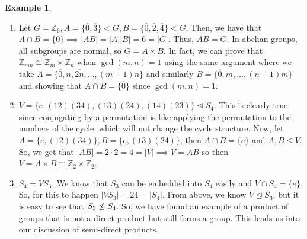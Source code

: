 \documentclass[11pt,leqno,oneside]{amsart}
\newcommand{\Z}{{\mathbb Z}} %
\newcommand{\subgroup}{\mathrel{<}}
\newcommand{\normsubgroup}{\mathrel{\unlhd}}
\newcommand{\isom}{\mathrel{\cong}}
\theoremstyle{definition}
\newtheorem{example}[thm]{Example}
\numberwithin{equation}{section}
\begin{document}
\begin{example}
    \begin{enumerate}[label=(\alph*)]
        \item Let $G = \Z_6, A = \{\overline{0}, \overline{3}\} \subgroup G, B
            = \{\overline{0}, \overline{2}, \overline{4}\} \subgroup G$. Then,
            we have that $A \cap B = \{ \overline{0} \} \implies |AB|=|A||B| =
            6 = |G|$. Thus, $AB = G$. In abelian groups, all subgroups are
            normal, so $G = A \times B$. In fact, we can prove that $\Z_{mn}
            \isom \Z_m \times \Z_n$ when $\gcd(m,n) = 1$ using the same
            argument where we take $A = \{\overline{0}, \overline{n},
            \overline{2n}, \ldots, \overline{(m-1)n}\}$ and similarly $B =
            \{\overline{0}, \overline{m}, \ldots, \overline{(n-1)m}\}$ and
            showing that $A \cap B = \{\overline{0}\}$ since $\gcd(m,n) = 1$.
        \item $V = \{e, (12)(34), (13)(24), (14)(23)\} \normsubgroup S_4$. This
            is clearly true since conjugating by a permutation is like applying
            the permutation to the numbers of the cycle, which will not change
            the cycle structure. Now, let $A = \{e, (12)(34)\}, B = \{e, (13)(24)\}$, then $A \cap B = \{e\}$ and $A,B \normsubgroup V$. So,
            we get that $|AB| = 2\cdot 2 = 4 = |V| \implies V = AB$ so then $V
            = A \times B \isom \Z_2 \times \Z_2$.
        \item $S_4 = VS_3$. We know that $S_3$ can be embedded into $S_4$
            easily and $V \cap S_4 = \{e\}$. So, for this to happen $|VS_3| =
            24 = |S_4|$. From above, we know $V \normsubgroup S_3$, but it is
            easy to see that $S_3 \not\normsubgroup S_4$. So, we have found an
            example of a product of groups that is not a direct product but
            still forms a group. This leads us into our discussion of
            semi-direct products.
    \end{enumerate}
\end{example}
\end{document}
